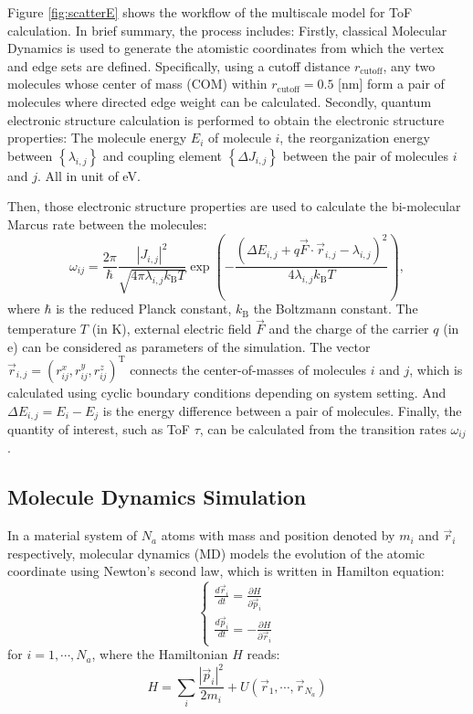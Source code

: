\documentclass[letterpaper,12pt]{article}
\begin{document}
Figure \ref{fig:scatterE} shows the workflow of the multiscale model for ToF calculation. In brief summary, the process includes: Firstly, classical Molecular Dynamics is used to generate the atomistic coordinates from which the vertex and edge sets are defined.
Specifically, using a cutoff distance $r_\text{cutoff}$, any two molecules whose center of mass (COM) within $r_\text{cutoff}=0.5$ [nm] form a pair of molecules where directed edge weight can be calculated.
Secondly, quantum electronic structure calculation is performed to obtain the electronic structure properties: The molecule energy $E_i$ of molecule $i$, the reorganization energy between $\left\{\lambda_{i,j}\right\}$ and coupling element $\left\{\Delta J_{i,j}\right\}$ between the pair of molecules $i$ and $j$. All in unit of eV. 

Then, those electronic structure properties are used to calculate the bi-molecular Marcus rate between the molecules:
%
\begin{equation}
    \omega_{ij} = \frac{2\pi}{\hbar} \frac{|J_{i,j}|^2}{\sqrt{4\pi \lambda_{i,j} k_\text{B}T}} \exp\left(-\frac{(\Delta E_{i,j} + q \vec{F} \cdot \vec{r}_{i,j} - \lambda_{i,j})^2}{4\lambda_{i,j} k_\text{B}T}\right) ,
    \label{equ:Marcus}
\end{equation}
%
where $\hbar$ is the reduced Planck constant, $k_\text{B}$ the Boltzmann constant. The temperature $T$ (in \unit[]{K}), external electric field $\vec{F}$ and the charge of the carrier $q$ (in \unit[]{e}) can be considered as parameters of the simulation. The vector $\vec{r}_{i,j} = (r^x_{ij},r^y_{ij},r^z_{ij})^\text{T}$ connects the center-of-masses of molecules $i$ and $j$, which is calculated using cyclic boundary conditions depending on system setting. And $\Delta E_{i,j} = E_i - E_j$ is the energy difference between a pair of molecules.
Finally, the quantity of interest, such as ToF $\tau$, can be calculated from the transition rates $\omega_{ij}$.

\subsection{Molecule Dynamics Simulation}
In a material system of $N_a$ atoms with mass and position denoted by $m_i$ and $\vec{r}_i$ respectively, molecular dynamics (MD) models the evolution of the atomic coordinate using Newton's second law, which is written in Hamilton equation: 
\begin{equation}
    \begin{cases}
        \frac{d \vec{r}_i}{dt} = \frac{\partial H }{\partial \vec{p}_i} \\
        \frac{d \vec{p}_i}{dt} = -\frac{\partial H }{\partial \vec{r}_i}
    \end{cases}
    \label{eq:Hamilton}
\end{equation}
for $i=1,\cdots,N_a$, where the Hamiltonian $H$ reads:
\begin{equation}
    H=\sum\limits_{i} \frac{|\vec{p}_i|^2}{2 m_i} + U(\vec{r}_1,\cdots,\vec{r}_{N_a})
    \label{eq:Hamilton2}
\end{equation} 
\end{document}
